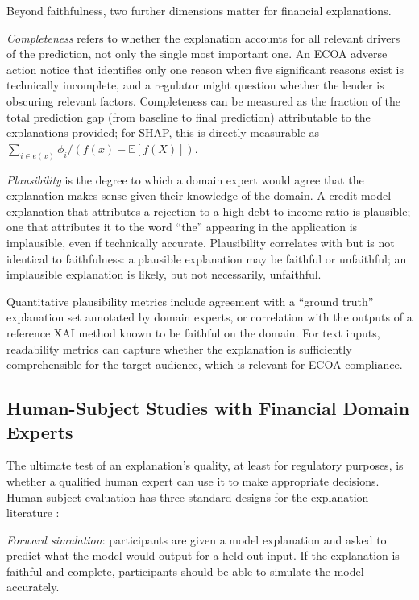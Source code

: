 Beyond faithfulness, two further dimensions matter for financial explanations.

\emph{Completeness} refers to whether the explanation accounts for all relevant drivers
of the prediction, not only the single most important one. An ECOA adverse action notice
that identifies only one reason when five significant reasons exist is technically
incomplete, and a regulator might question whether the lender is obscuring relevant
factors. Completeness can be measured as the fraction of the total prediction gap (from
baseline to final prediction) attributable to the explanations provided; for SHAP, this
is directly measurable as $\sum_{i \in e(x)} \phi_i / (f(x) - \mathbb{E}[f(X)])$.

\emph{Plausibility} is the degree to which a domain expert would agree that the
explanation makes sense given their knowledge of the domain. A credit model explanation
that attributes a rejection to a high debt-to-income ratio is plausible; one that
attributes it to the word ``the'' appearing in the application is implausible, even if
technically accurate. Plausibility correlates with but is not identical to faithfulness:
a plausible explanation may be faithful or unfaithful; an implausible explanation is
likely, but not necessarily, unfaithful.

Quantitative plausibility metrics include agreement with a ``ground truth'' explanation
set annotated by domain experts, or correlation with the outputs of a reference XAI
method known to be faithful on the domain. For text inputs, readability metrics can
capture whether the explanation is sufficiently comprehensible for the target audience,
which is relevant for ECOA compliance.

\subsection{Human-Subject Studies with Financial Domain Experts}
\label{sec:ch12-human-subject-studies}

The ultimate test of an explanation's quality, at least for regulatory purposes, is
whether a qualified human expert can use it to make appropriate decisions. Human-subject
evaluation has three standard designs for the explanation literature \cite{doshivelez2017rigorous}:

\emph{Forward simulation}: participants are given a model explanation and asked to predict
what the model would output for a held-out input. If the explanation is faithful and
complete, participants should be able to simulate the model accurately.

